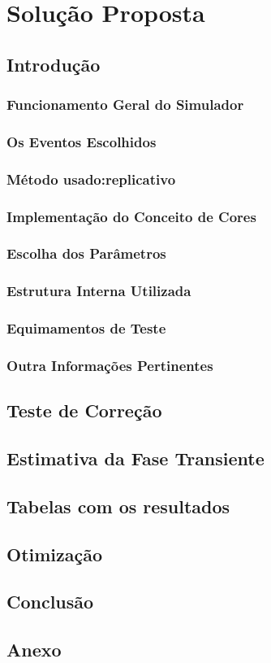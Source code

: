 \documentclass[a4paper,10pt]{article}
\begin{document}
\section{Solução Proposta}
      \subsection{Introdução}
	\subsubsection{Funcionamento Geral do Simulador}
	\subsubsection{Os Eventos Escolhidos}
	\subsubsection{Método usado:replicativo}
	\subsubsection{Implementação do Conceito de Cores}
	\subsubsection{Escolha dos Parâmetros}
	\subsubsection{Estrutura Interna Utilizada}
	\subsubsection{Equimamentos de Teste}
	\subsubsection{Outra Informações Pertinentes}
      \subsection{Teste de Correção}
      \subsection{Estimativa da Fase Transiente}
      \subsection{Tabelas com os resultados}
      \subsection{Otimização}
      \subsection{Conclusão}
      \subsection{Anexo}
\end{document}
